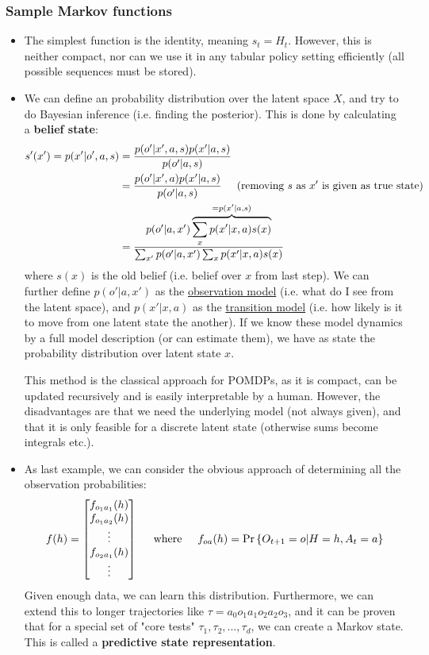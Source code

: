 \subsubsection{Sample Markov functions}
\begin{itemize}
	\item The simplest function is the identity, meaning $s_t=H_t$. However, this is neither compact, nor can we use it in any tabular policy setting efficiently (all possible sequences must be stored).
	\item We can define an probability distribution over the latent space $X$, and try to do Bayesian inference (i.e. finding the posterior). This is done by calculating a \textbf{belief state}:
	\begin{equation*}
		\begin{split}
			s'(x')=p(x'|o',a,s)& =\frac{p(o'|x',a,s)p(x'|a,s)}{p(o'|a,s)}\\
			& = \frac{p(o'|x',a)p(x'|a,s)}{p(o'|a,s)}\hspace{5mm}\text{(removing $s$ as $x'$ is given as true state)}\\
			& = \frac{p(o'|a,x')\overbrace{\sum_x p(x'|x,a)s(x)}^{=p(x'|a,s)}}{\sum_{x'}p(o'|a,x')\sum_x p(x'|x,a)s(x)}
		\end{split}
	\end{equation*}
	where $s(x)$ is the old belief (i.e. belief over $x$ from last step). We can further define $p(o'|a,x')$ as the \underline{observation model} (i.e. what do I see from the latent space), and $p(x'|x,a)$ as the \underline{transition model} (i.e. how likely is it to move from one latent state the another). If we know these model dynamics by a full model description (or can estimate them), we have as state the probability distribution over latent state $x$.
	
	This method is the classical approach for POMDPs, as it is compact, can be updated recursively and is easily interpretable by a human. However, the disadvantages are that we need the underlying model (not always given), and that it is only feasible for a discrete latent state (otherwise sums become integrals etc.).
	\item As last example, we can consider the obvious approach of determining all the observation probabilities:
	$$f(h)=\begin{bmatrix}
	f_{o_1a_1}(h)\\ f_{o_1a_2}(h)\\\vdots\\f_{o_2a_1}(h)\\\vdots\\
	\end{bmatrix}\hspace{5mm}\text{where}\hspace{5mm}f_{oa}(h)=\Pr\left\{O_{t+1}=o|H=h,A_t=a\right\}$$
	Given enough data, we can learn this distribution. Furthermore, we can extend this to longer trajectories like $\tau=a_0o_1a_1o_2a_2o_3$, and it can be proven that for a special set of "core tests" $\tau_1,\tau_2,...,\tau_d$, we can create a Markov state. This is called a \textbf{predictive state representation}.
	

\end{itemize}
